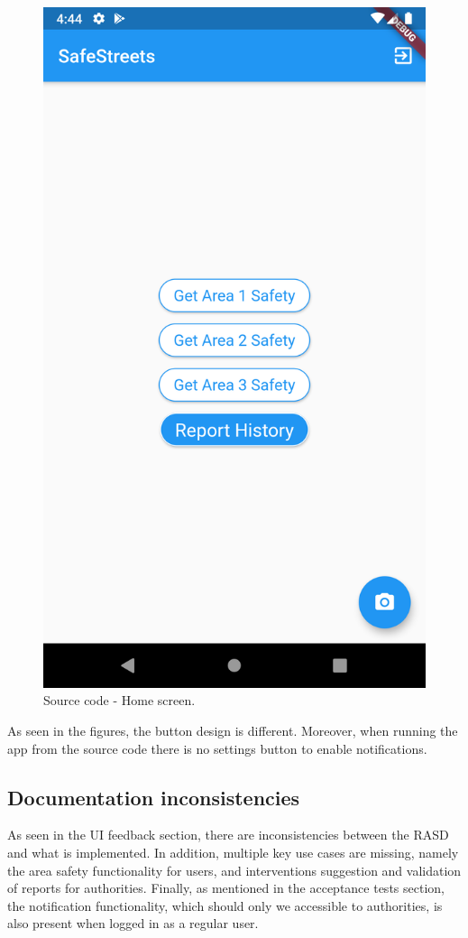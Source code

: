 \begin{figure}[H]
\begin{minipage}{.465\textwidth}
        \includegraphics[width=.8\textwidth]{Images/source-home.png}
        \caption{\label{fig:source-home}Source code - Home screen.}
    \end{minipage}
    \end{figure}

As seen in the figures, the button design is different. Moreover, when running the app from the source code there is no settings button to enable notifications.

\subsection{Documentation inconsistencies}
As seen in the UI feedback section, there are inconsistencies between the RASD and what is implemented. In addition, multiple key use cases are missing, namely the area safety functionality for users, and interventions suggestion and validation of reports for authorities.
Finally, as mentioned in the acceptance tests section, the notification functionality, which should only we accessible to authorities, is also present when logged in as a regular user.